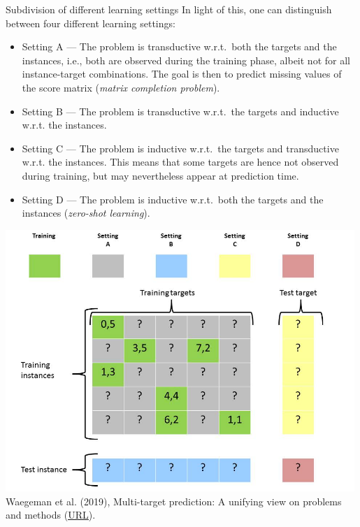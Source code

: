 \begin{frame}{Subdivision of different learning settings}
%	
	\footnotesize
	In light of this, one can distinguish between four different learning settings:
%	
	\begin{itemize} \footnotesize
		\item Setting A --- The problem is transductive w.r.t.\ both the targets and the instances, i.e., both are observed during the training phase, albeit not for all instance-target combinations. The goal is then to predict missing values of the score matrix (\emph{matrix completion problem}).
		\item Setting B --- The problem is transductive w.r.t.\ the targets and inductive w.r.t. the instances. 
%	
	\end{itemize}
%
	\begin{minipage}{0.45\textwidth}
		\begin{itemize} \footnotesize
			\item Setting C --- The problem is inductive w.r.t.\ the targets and transductive w.r.t. the instances. This means that some targets are hence not observed during training, but may nevertheless appear at prediction time.
			\item Setting D --- The problem is inductive w.r.t.\ both the targets and the instances (\emph{zero-shot learning}).
		\end{itemize}
	\end{minipage}
%	
	\begin{minipage}{0.4\textwidth}
	\center
	\includegraphics[width=0.99\textwidth,trim = 0 0 50 0,clip]{figure/Slide16}  \tiny
	\\ Waegeman et al. (2019), Multi-target prediction:
	A unifying view on problems and methods (\href{https://arxiv.org/pdf/1809.02352.pdf}{\underline{URL}}).
	\end{minipage}
\end{frame}



%
\endlecture

